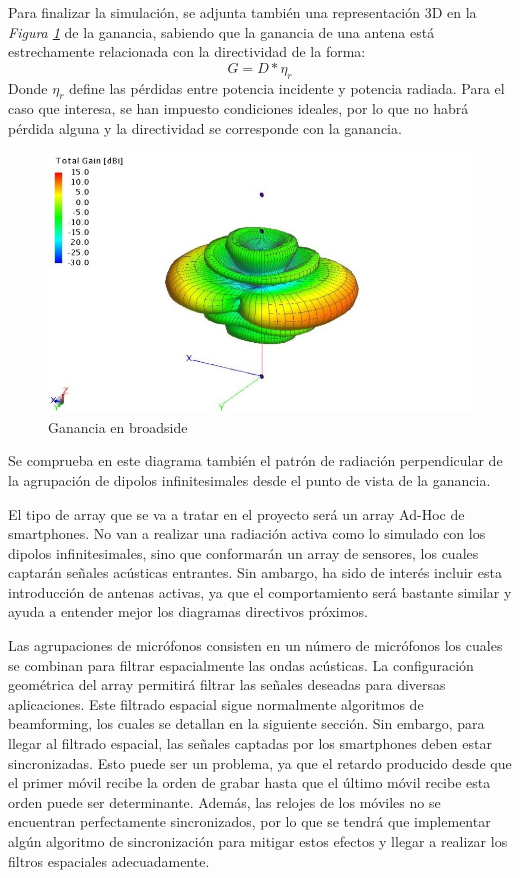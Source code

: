 \documentclass[a4paper,11pt]{book}
\begin{document}
Para finalizar la simulación, se adjunta también una representación 3D en la\textit{ Figura \ref{feko3d}} de la ganancia, sabiendo que la ganancia de una antena está estrechamente relacionada con la directividad de la forma:
\begin{equation}
G = D * \eta_{r}
\end{equation}
Donde $\eta_{r}$ define las pérdidas entre potencia incidente y potencia radiada. Para el caso que interesa, se han impuesto condiciones ideales, por lo que no habrá pérdida alguna y la directividad se corresponde con la ganancia. 
\begin{figure}[hbtp]
\centering
\includegraphics[width = 12cm]{FIGURAS/ganancia_broadside.jpg}
\caption{Ganancia en broadside}
\label{feko3d}
\end{figure}

Se comprueba en este diagrama también el patrón de radiación perpendicular de la agrupación de dipolos infinitesimales desde el punto de vista de la ganancia.

	 
	 El tipo de array que se va a tratar en el proyecto será un array Ad-Hoc de smartphones. No van a realizar una radiación activa como lo simulado con los dipolos infinitesimales, sino que conformarán un array de sensores, los cuales captarán señales acústicas entrantes. Sin ambargo, ha sido de interés incluir esta introducción de antenas activas, ya que el comportamiento será bastante similar y ayuda a entender mejor los diagramas directivos próximos.
	 
	  Las agrupaciones de micrófonos consisten en un número de micrófonos los cuales se combinan para filtrar espacialmente las ondas acústicas. La configuración geométrica del array permitirá filtrar las señales deseadas para diversas aplicaciones. Este filtrado espacial sigue normalmente algoritmos de beamforming, los cuales se detallan en la siguiente sección. Sin embargo, para llegar al filtrado espacial, las señales captadas por los smartphones deben estar sincronizadas. Esto puede ser un problema, ya que el retardo producido desde que el primer móvil recibe la orden de grabar hasta que el último móvil recibe esta orden puede ser determinante. Además, las relojes de los móviles no se encuentran perfectamente sincronizados, por lo que se tendrá que implementar algún algoritmo de sincronización para mitigar estos efectos y llegar a realizar los filtros espaciales adecuadamente.
	 
\end{document}

